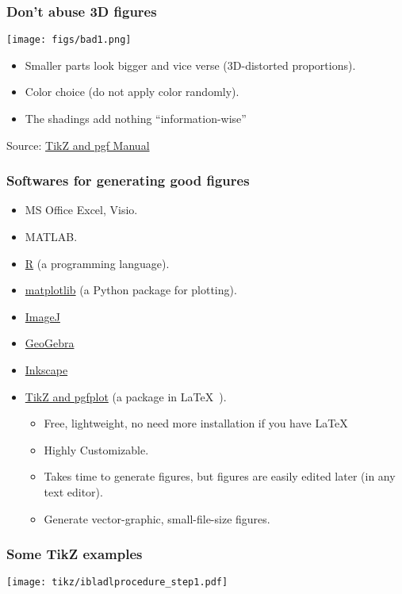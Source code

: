 \documentclass[hyperref={pdfpagelayout=SinglePage}]{beamer}
\def\tcb{\color{blue}}
\def\mylatex{\textrm{\LaTeX~}}
\begin{document}
\begin{frame}
\frametitle{Don't abuse 3D figures}
\begin{center}
\texttt{[image: figs/bad1.png]}
\end{center}
\begin{itemize}
    \item Smaller parts look bigger and vice verse (3D-distorted proportions). 
    \item Color choice (do not apply color randomly).
    \item The shadings add nothing ``information-wise''
\end{itemize}
Source: \href{https://www.bu.edu/math/files/2013/08/tikzpgfmanual.pdf}{\tcb TikZ and pgf Manual}
\end{frame}



\begin{frame}
\frametitle{Softwares for generating good figures}
\begin{itemize}
    \item MS Office Excel, Visio. 
    \item MATLAB.
    \item \href{https://www.r-project.org/}{\tcb R} (a programming language).
    \item \href{http://matplotlib.org/}{\tcb matplotlib} (a Python package for plotting).
    \item \href{https://imagej.nih.gov/ij/}{\tcb ImageJ}
    \item \href{https://www.geogebra.org/}{\tcb GeoGebra}
    \item \href{https://inkscape.org/en/}{\tcb Inkscape}
    \item \href{http://pgfplots.sourceforge.net/gallery.html}{\tcb TikZ and pgfplot} (a package in \mylatex).
    \begin{itemize}
        \item Free, lightweight, no need more installation if you have \mylatex
        \item Highly Customizable.
        \item Takes time to generate figures, but figures are easily edited later (in any text editor). 
        \item Generate vector-graphic, small-file-size figures.
    \end{itemize}
\end{itemize}
\end{frame}
\begin{frame}
\frametitle{Some TikZ examples}
\begin{center}
\texttt{[image: tikz/ibladlprocedure\_step1.pdf]}
\end{center}
\end{frame}
\end{document}
